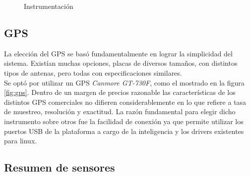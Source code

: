 \documentclass[main]{subfiles}
\begin{document}
\begin{figure} 
  \vspace{-40pt}
  \centering
  \hspace{2cm}
  
  \caption{Instrumentaci\'on}
  \label{fig:intrumentacion}
\end{figure}

\subsection{GPS}

La elecci\'on del GPS se bas\'o fundamentalmente en lograr la simplicidad del sistema. Exist\'ian muchas opciones, placas de diversos tama\~nos, con distintos tipos de antenas, pero todas con especificaciones similares.\\

Se opt\'o por utilizar un GPS \textit{Canmore GT-730F}, como el mostrado en la figura \ref{fig:gps}. Dentro de un margen de precios razonable las caracter\'isticas de los distintos GPS comerciales no difieren considerablemente en lo que refiere a tasa de muestreo, resoluci\'on y exactitud. La raz\'on fundamental para elegir dicho instrumento sobre otros fue la facilidad de conexi\'on ya que permite utilizar los puertos USB de la plataforma a cargo de la inteligencia y los drivers existentes para linux. \\ 

\subsection{Resumen de sensores}
\label{sec:hardware:resumen-de-sensores}
\end{document}
